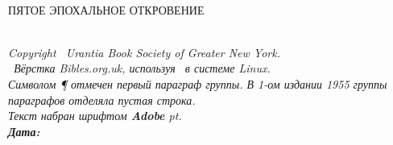 \begin{center}
\bibcovertitlefont\urantiabook\\[3ex]
\LARGE ПЯТОЕ ЭПОХАЛЬНОЕ ОТКРОВЕНИЕ\\
\titlesepbig\\
\end{center}

\titleframe

\newpage

\begin{center}
\itshape
{}
Copyright \textcopyright\ Urantia Book Society of Greater New York.\\
\tux\ Вёрстка Bibles.org.uk, используя \XeLaTeX\ в системе Linux.\\
Символом {\upshape \P} отмечен первый параграф группы. В 1-ом издании 1955 группы параграфов отделяла пустая строка.\\
Текст набран шрифтом \textbf{Adobe \urantiamainfont} \urantiamainfontsize pt.\\[4pt]
\upshape\normalsize\bfseries Дата: \mytoday{}\\
\end{center}

\titleframe
